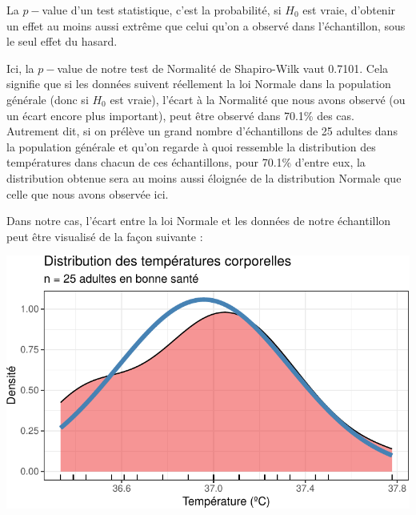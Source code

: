 \documentclass[
  a4paper,
  DIV=11,
  numbers=noendperiod,
  oneside]{scrreprt}
\begin{document}
\begin{tcolorbox}[enhanced jigsaw, breakable, toprule=.15mm, colbacktitle=quarto-callout-tip-color!10!white, colframe=quarto-callout-tip-color-frame, arc=.35mm, bottomtitle=1mm, opacityback=0, title=\textcolor{quarto-callout-tip-color}{\faLightbulb}\hspace{0.5em}{Définition : la \(p-\)value}, bottomrule=.15mm, colback=white, toptitle=1mm, rightrule=.15mm, leftrule=.75mm, opacitybacktitle=0.6, left=2mm, titlerule=0mm, coltitle=black]

La \(p-\)value d'un test statistique, c'est la probabilité, si \(H_0\)
est vraie, d'obtenir un effet au moins aussi extrême que celui qu'on a
observé dans l'échantillon, sous le seul effet du hasard.

\end{tcolorbox}

Ici, la \(p-\)value de notre test de Normalité de Shapiro-Wilk vaut
0.7101. Cela signifie que si les données suivent réellement la loi
Normale dans la population générale (donc si \(H_0\) est vraie), l'écart
à la Normalité que nous avons observé (ou un écart encore plus
important), peut être observé dans 70.1\% des cas. Autrement dit, si on
prélève un grand nombre d'échantillons de 25 adultes dans la population
générale et qu'on regarde à quoi ressemble la distribution des
températures dans chacun de ces échantillons, pour 70.1\% d'entre eux,
la distribution obtenue sera au moins aussi éloignée de la distribution
Normale que celle que nous avons observée ici.

Dans notre cas, l'écart entre la loi Normale et les données de notre
échantillon peut être visualisé de la façon suivante :

\includegraphics{01-OneSampleTests_files/figure-pdf/unnamed-chunk-18-1.pdf}
\end{document}
